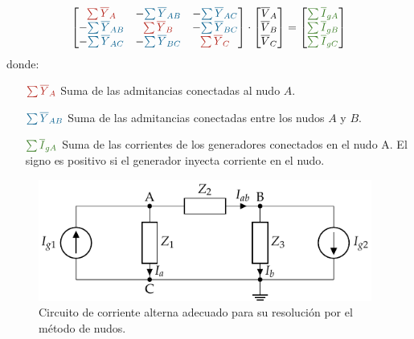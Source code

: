 \begin{equation*}
  \begin{bmatrix}
    {\color{BrickRed}\sum \overline{Y}_A} & - {\color{MidnightBlue}\sum \overline{Y}_{AB}} & - {\color{MidnightBlue}\sum \overline{Y}_{AC}}\\
    -{\color{MidnightBlue}\sum \overline{Y}_{AB}} & {\color{BrickRed}\sum \overline{Y}_B} & -{\color{MidnightBlue}\sum \overline{Y}_{BC}}\\
    -{\color{MidnightBlue}\sum \overline{Y}_{AC}} & -{\color{MidnightBlue}\sum \overline{Y}_{BC}} & {\color{BrickRed}\sum \overline{Y}_C}
  \end{bmatrix} \cdot%
  \begin{bmatrix}
    \overline{V}_A\\
    \overline{V}_B\\
    \overline{V}_C
  \end{bmatrix} = %
  \begin{bmatrix}
    {\color{OliveGreen}\sum \overline{I}_{gA}}\\
    {\color{OliveGreen}\sum \overline{I}_{gB}}\\
    {\color{OliveGreen}\sum \overline{I}_{gC}}
  \end{bmatrix}
\end{equation*}
donde:
\begin{itemize}
\item[{\({\color{BrickRed}\sum \overline{Y}_A}\)}] Suma de las
  admitancias conectadas al nudo \(A\).
\item[{\({\color{MidnightBlue}\sum \overline{Y}_{AB}}\)}] Suma de las
  admitancias conectadas entre los nudos \(A\) y \(B\).
\item[{\({\color{OliveGreen}\sum \overline{I}_{gA}}\)}] Suma de las
  corrientes de los generadores conectados en el nudo A. El signo es
  positivo si el generador inyecta corriente en el nudo.
\end{itemize}

\begin{figure}[H]
  \centering \includegraphics[height=4cm]{../figs/nudosAC.pdf}
  \caption{Circuito de corriente alterna adecuado para su resolución
    por el método de nudos.}
  \label{fig:nudos-alterna}
\end{figure}

